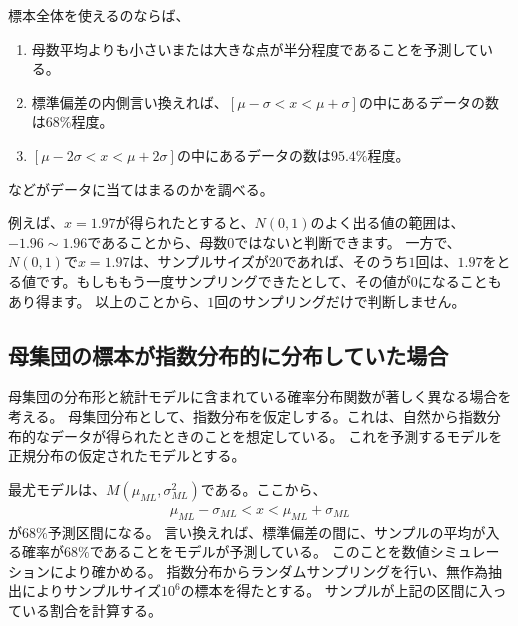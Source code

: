 標本全体を使えるのならば、
\begin{enumerate}
 \item 母数平均よりも小さいまたは大きな点が半分程度であることを予測している。
 \item 標準偏差の内側言い換えれば、$[\mu-\sigma<x<\mu+\sigma]$の中にあるデータの数は$68\%$程度。
 \item $[\mu-2\sigma < x < \mu+2\sigma]$の中にあるデータの数は$95.4\%$程度。
\end{enumerate}
などがデータに当てはまるのかを調べる。




例えば、$x=1.97$が得られたとすると、$N(0,1)$のよく出る値の範囲は、$-1.96\sim1.96$であることから、母数$0$ではないと判断できます。
一方で、$N(0,1)$で$x=1.97$は、サンプルサイズが$20$であれば、そのうち$1$回は、$1.97$をとる値です。もしももう一度サンプリングできたとして、その値が$0$になることもあり得ます。
以上のことから、$1$回のサンプリングだけで判断しません。
\fi

\subsection{母集団の標本が指数分布的に分布していた場合}
母集団の分布形と統計モデルに含まれている確率分布関数が著しく異なる場合を考える。
母集団分布として、指数分布を仮定しする。これは、自然から指数分布的なデータが得られたときのことを想定している。
これを予測するモデルを正規分布の仮定されたモデルとする。

最尤モデルは、$M(\mu_{ML},\sigma^2_{ML})$である。ここから、
\begin{eqnarray*}
    \mu_{ML}-\sigma_{ML} < x < \mu_{ML}+\sigma_{ML}
\end{eqnarray*}
が$68\%$予測区間になる。
言い換えれば、標準偏差の間に、サンプルの平均が入る確率が$68\%$であることをモデルが予測している。
このことを数値シミュレーションにより確かめる。
指数分布からランダムサンプリングを行い、無作為抽出によりサンプルサイズ$10^6$の標本を得たとする。
サンプルが上記の区間に入っている割合を計算する。

